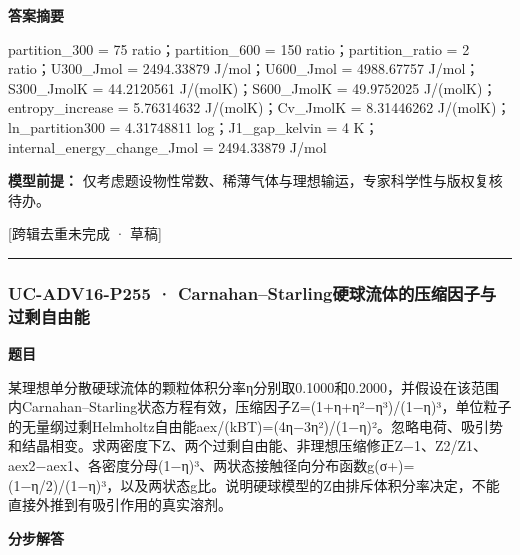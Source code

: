 \documentclass[UTF8,11pt,a4paper]{ctexart}
\begin{document}
\noindent\textbf{答案摘要}\par
partition\_300 = 75 ratio；partition\_600 = 150 ratio；partition\_ratio = 2 ratio；U300\_Jmol = 2494.33879 J/mol；U600\_Jmol = 4988.67757 J/mol；S300\_JmolK = 44.2120561 J/(molK)；S600\_JmolK = 49.9752025 J/(molK)；entropy\_increase = 5.76314632 J/(molK)；Cv\_JmolK = 8.31446262 J/(molK)；ln\_partition300 = 4.31748811 log；J1\_gap\_kelvin = 4 K；internal\_energy\_change\_Jmol = 2494.33879 J/mol\par
\noindent\textbf{模型前提：}
仅考虑题设物性常数、稀薄气体与理想输运，专家科学性与版权复核待办。\par
\noindent\textcolor{red!65!black}{[跨辑去重未完成 · 草稿]} \par
\medskip\hrule\medskip
{}
\subsubsection*{UC-ADV16-P255 · Carnahan–Starling硬球流体的压缩因子与过剩自由能}
\noindent\textbf{题目}\par
某理想单分散硬球流体的颗粒体积分率η分别取0.1000和0.2000，并假设在该范围内Carnahan–Starling状态方程有效，压缩因子Z=(1+η+η²−η³)/(1−η)³，单位粒子的无量纲过剩Helmholtz自由能aex/(kBT)=(4η−3η²)/(1−η)²。忽略电荷、吸引势和结晶相变。求两密度下Z、两个过剩自由能、非理想压缩修正Z−1、Z2/Z1、aex2−aex1、各密度分母(1−η)³、两状态接触径向分布函数g(σ+)=(1−η/2)/(1−η)³，以及两状态g比。说明硬球模型的Z由排斥体积分率决定，不能直接外推到有吸引作用的真实溶剂。\par
\medskip\noindent\textbf{分步解答}
\end{document}
